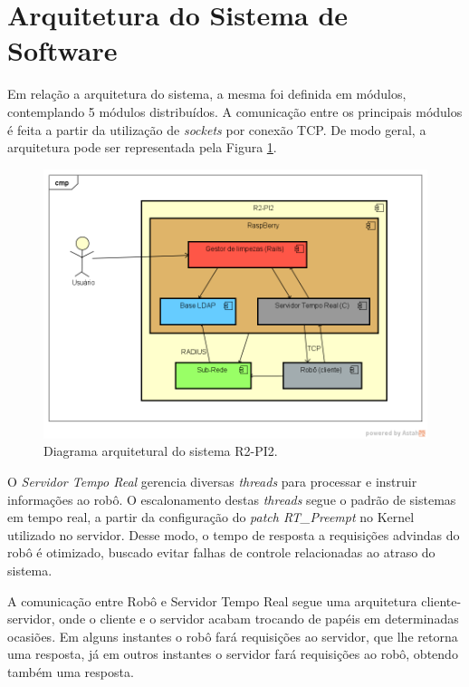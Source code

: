 \section{Arquitetura do Sistema de Software} %
\label{sub:arquitetura}

Em relação a arquitetura do sistema, a mesma foi definida em módulos, contemplando 5 módulos distribuídos. A comunicação entre os principais módulos é feita a partir da utilização de \textit{sockets} por conexão TCP. De modo geral, a arquitetura pode ser representada pela Figura \ref{img:arquitetura}.

\begin{figure}[H]
	\centering
	\includegraphics[scale=0.7]{figuras/diagrama_arquitetural.png}
	\caption{Diagrama arquitetural do sistema R2-PI2.}
	\label{img:arquitetura}
\end{figure}

O \textit{Servidor Tempo Real} gerencia diversas \textit{threads} para processar e instruir informações ao robô. O escalonamento destas \textit{threads} segue o padrão de sistemas em tempo real, a partir da configuração do \textit{patch RT\_Preempt} no Kernel utilizado no servidor. Desse modo, o tempo de resposta a requisições advindas do robô é otimizado, buscado evitar falhas de controle relacionadas ao atraso do sistema.

A comunicação entre Robô e Servidor Tempo Real segue uma arquitetura cliente-servidor, onde o cliente e o servidor acabam trocando de papéis em determinadas ocasiões. Em alguns instantes o robô fará requisições ao servidor, que lhe retorna uma resposta, já em outros instantes o servidor fará requisições ao robô, obtendo também uma resposta. 

